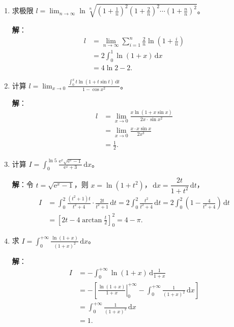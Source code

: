 \documentclass[a4paper,11pt]{ctexart}
\newcommand{\dd}{\,\mathrm{d}}
\newcommand{\e}{\mathrm{e}}
\newcommand{\score}[1]{\hfill{\text{（#1 分）}}}
\begin{document}
\begin{enumerate}[label=\arabic*., start=9, leftmargin=2em, itemsep=0.9em, topsep=0.5em]
  \item 求极限 $l=\displaystyle\lim_{n\to\infty}\ln\sqrt[n]{\left(1+\frac{1}{n}\right)^2\left(1+\frac{2}{n}\right)^2\cdots\left(1+\frac{n}{n}\right)^2}$。

  \textbf{解}：
  \begin{align*}
    l &= \lim_{n\to\infty}\sum_{i=1}^n \frac{2}{n}\ln\left(1+\frac{i}{n}\right) \tag*{（3 分）}\\
      &= 2\int_0^1\ln(1+x)\dd x \tag*{（6 分）}\\
      &= 4\ln 2 - 2. \tag*{（8 分）}
  \end{align*}

  \item 计算 $l=\displaystyle\lim_{x\to 0}\frac{\displaystyle\int_0^x t\ln(1+t\sin t)\dd t}{1-\cos x^2}$。

  \textbf{解}：
  \begin{align*}
    l &= \lim_{x\to 0}\frac{x\ln(1+x\sin x)}{2x\cdot\sin x^2} \tag*{（4 分）}\\
      &= \lim_{x\to 0}\frac{x\cdot x\sin x}{2x^3} \tag*{（6 分）}\\
      &= \frac{1}{2}. \tag*{（8 分）}
  \end{align*}

  \item 计算 $I=\displaystyle\int_0^{\ln 5}\frac{\e^x\sqrt{\e^x-1}}{\e^x+3}\dd x$。

  \textbf{解}：令 $t=\sqrt{\e^x-1}$，则 $x=\ln(1+t^2)$，$\dd x=\dfrac{2t}{1+t^2}\dd t$，\score{3}
  \begin{align*}
    I &= \int_0^2\frac{(t^2+1)t}{t^2+4}\cdot\frac{2t}{t^2+1}\dd t
       = 2\int_0^2\frac{t^2}{t^2+4}\dd t
       = 2\int_0^2\left(1-\frac{4}{t^2+4}\right)\dd t \tag*{（6 分）}\\
      &= \left[2t - 4\arctan\frac{t}{2}\right]_0^2 = 4 - \pi. \tag*{（8 分）}
  \end{align*}

  \item 求 $I=\displaystyle\int_0^{+\infty}\frac{\ln(1+x)}{(1+x)^2}\dd x$。

  \textbf{解}：
  \begin{align*}
    I &= -\int_0^{+\infty}\ln(1+x)\dd\frac{1}{1+x} \tag*{（3 分）}\\
      &= -\left[\left.\frac{\ln(1+x)}{1+x}\right|_0^{+\infty} - \int_0^{+\infty}\frac{1}{(1+x)^2}\dd x\right] \\
      &= \int_0^{+\infty}\frac{1}{(1+x)^2}\dd x \tag*{（6 分）}\\
      &= 1. \tag*{（8 分）}
  \end{align*}
\end{enumerate}
\end{document}
